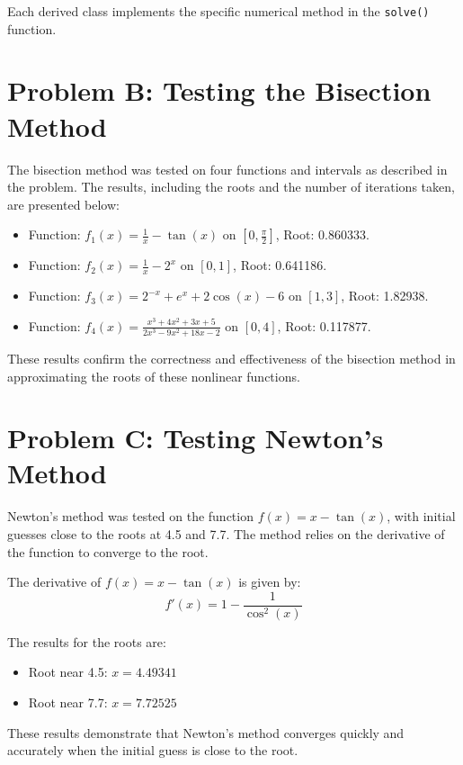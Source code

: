 \documentclass[a4paper]{article}
\begin{document}
Each derived class implements the specific numerical method in the \texttt{solve()} function.

\section*{Problem B: Testing the Bisection Method}

The bisection method was tested on four functions and intervals as described in the problem. The results, including the roots and the number of iterations taken, are presented below:

\begin{itemize}
    \item Function: \( f_1(x) = \frac{1}{x} - \tan(x) \) on \( [0, \frac{\pi}{2}] \), Root: 0.860333.
    \item Function: \( f_2(x) = \frac{1}{x} - 2^x \) on \( [0, 1] \), Root: 0.641186.
    \item Function: \( f_3(x) = 2^{-x} + e^x + 2\cos(x) - 6 \) on \( [1, 3] \), Root: 1.82938.
    \item Function: \( f_4(x) = \frac{x^3 + 4x^2 + 3x + 5}{2x^3 - 9x^2 + 18x - 2} \) on \( [0, 4] \), Root: 0.117877.
\end{itemize}

These results confirm the correctness and effectiveness of the bisection method in approximating the roots of these nonlinear functions.

\section*{Problem C: Testing Newton's Method}

Newton's method was tested on the function \( f(x) = x - \tan(x) \), with initial guesses close to the roots at 4.5 and 7.7. The method relies on the derivative of the function to converge to the root.

The derivative of \( f(x) = x - \tan(x) \) is given by:
\[
f'(x) = 1 - \frac{1}{\cos^2(x)}
\]

The results for the roots are:
\begin{itemize}
    \item Root near 4.5: \( x = 4.49341 \)
    \item Root near 7.7: \( x = 7.72525 \)
\end{itemize}

These results demonstrate that Newton's method converges quickly and accurately when the initial guess is close to the root.
\end{document}

